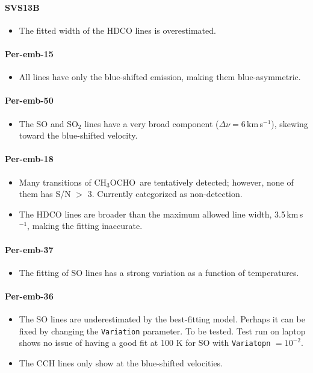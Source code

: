 \documentclass[twocolumn]{aastex62}
\newcommand{\kms}{\mbox{\,km\,s$^{-1}$}}
\newcommand{\methylformate}{\mbox{CH$_{3}$OCHO}}
\begin{document}
\paragraph{SVS13B}
\begin{itemize}
  \item The fitted width of the HDCO lines is overestimated.
\end{itemize}

\paragraph{Per-emb-15}
\begin{itemize}
  \item All lines have only the blue-shifted emission, making them blue-asymmetric.
\end{itemize}

\paragraph{Per-emb-50}
\begin{itemize}
  \item The SO and SO$_{2}$ lines have a very broad component ($\Delta \nu = $6\kms), skewing toward the blue-shifted velocity.
\end{itemize}

\paragraph{Per-emb-18}
\begin{itemize}
  \item Many transitions of \methylformate\ are tentatively detected; however, none of them has S/N $>$ 3.  Currently categorized as non-detection.
  \item The HDCO lines are broader than the maximum allowed line width, 3.5\kms, making the fitting inaccurate.
\end{itemize}

\paragraph{Per-emb-37}
\begin{itemize}
  \item The fitting of SO lines has a strong variation as a function of temperatures.
\end{itemize}

\paragraph{Per-emb-36}
\begin{itemize}
  \item The SO lines are underestimated by the best-fitting model.  Perhaps it can be fixed by changing the \texttt{Variation} parameter.  To be tested.  Test run on laptop shows no issue of having a good fit at 100 K for SO with \texttt{Variatopn} $= 10^{-2}$.
  \item The CCH lines only show at the blue-shifted velocities.
\end{itemize}
\end{document}

